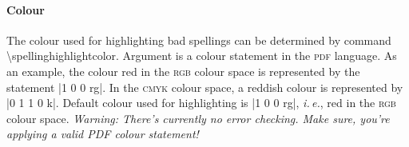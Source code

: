 \documentclass[11pt]{article}
\newcommand*{\acr}[1]{\mbox{\scshape#1}}
\newcommand*{\cmd}[1]{\mbox{\ttfamily\textbackslash#1}}
\newcommand*{\latinphrase}[1]{\foreignlanguage{latin}{\emph{#1}}}
\newcommand*{\lpie}{\latinphrase{i.\,e.}\xspace}
\begin{document}
\paragraph{Colour} The colour used for highlighting bad spellings can be
determined by command \cmd{spellinghighlightcolor}.  Argument is a
colour statement in the \acr{pdf} language.  As an example, the colour
red in the \acr{rgb} colour space is represented by the statement %
|1 0 0 rg|.  In the \acr{cmyk} colour space, a reddish colour is
represented by |0 1 1 0 k|.  Default colour used for highlighting is %
|1 0 0 rg|, \lpie, red in the \acr{rgb} colour space.  \emph{Warning:
  There's currently no error checking.  Make sure, you're applying a
  valid PDF colour statement!}
\end{document}
